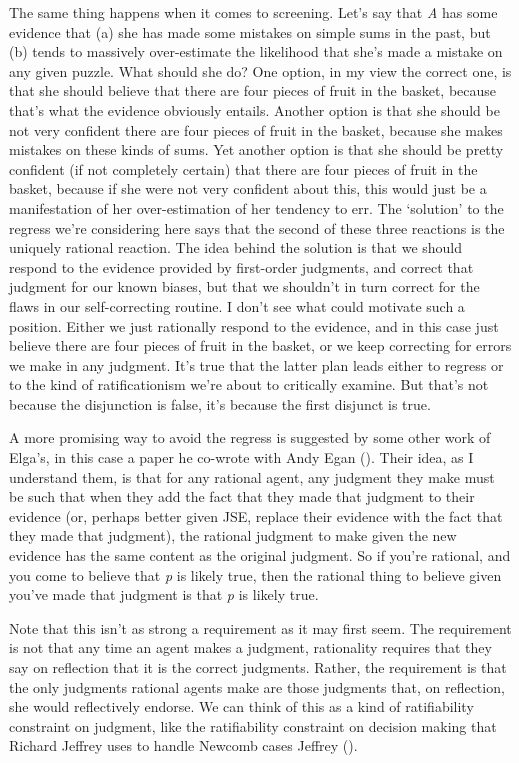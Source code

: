 \documentclass[
  10pt,
  letterpaper,
  DIV=11,
  numbers=noendperiod,
  twoside]{scrartcl}
\begin{document}
The same thing happens when it comes to screening. Let's say that
\emph{A} has some evidence that (a) she has made some mistakes on simple
sums in the past, but (b) tends to massively over-estimate the
likelihood that she's made a mistake on any given puzzle. What should
she do? One option, in my view the correct one, is that she should
believe that there are four pieces of fruit in the basket, because
that's what the evidence obviously entails. Another option is that she
should be not very confident there are four pieces of fruit in the
basket, because she makes mistakes on these kinds of sums. Yet another
option is that she should be pretty confident (if not completely
certain) that there are four pieces of fruit in the basket, because if
she were not very confident about this, this would just be a
manifestation of her over-estimation of her tendency to err. The
`solution' to the regress we're considering here says that the second of
these three reactions is the uniquely rational reaction. The idea behind
the solution is that we should respond to the evidence provided by
first-order judgments, and correct that judgment for our known biases,
but that we shouldn't in turn correct for the flaws in our
self-correcting routine. I don't see what could motivate such a
position. Either we just rationally respond to the evidence, and in this
case just believe there are four pieces of fruit in the basket, or we
keep correcting for errors we make in any judgment. It's true that the
latter plan leads either to regress or to the kind of ratificationism
we're about to critically examine. But that's not because the
disjunction is false, it's because the first disjunct is true.

A more promising way to avoid the regress is suggested by some other
work of Elga's, in this case a paper he co-wrote with Andy Egan
(). Their idea, as I
understand them, is that for any rational agent, any judgment they make
must be such that when they add the fact that they made that judgment to
their evidence (or, perhaps better given JSE, replace their evidence
with the fact that they made that judgment), the rational judgment to
make given the new evidence has the same content as the original
judgment. So if you're rational, and you come to believe that \emph{p}
is likely true, then the rational thing to believe given you've made
that judgment is that \emph{p} is likely true.

Note that this isn't as strong a requirement as it may first seem. The
requirement is not that any time an agent makes a judgment, rationality
requires that they say on reflection that it is the correct judgments.
Rather, the requirement is that the only judgments rational agents make
are those judgments that, on reflection, she would reflectively endorse.
We can think of this as a kind of ratifiability constraint on judgment,
like the ratifiability constraint on decision making that Richard
Jeffrey uses to handle Newcomb cases Jeffrey
().
\end{document}
